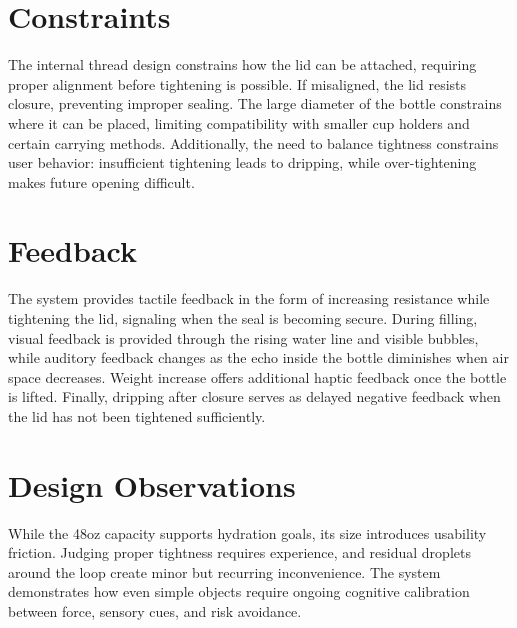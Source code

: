 \documentclass[12pt]{article}
\begin{document}
\section*{Constraints}

The internal thread design constrains how the lid can be attached, requiring proper alignment before tightening is possible. If misaligned, the lid resists closure, preventing improper sealing. The large diameter of the bottle constrains where it can be placed, limiting compatibility with smaller cup holders and certain carrying methods. Additionally, the need to balance tightness constrains user behavior: insufficient tightening leads to dripping, while over-tightening makes future opening difficult.

\section*{Feedback}

The system provides tactile feedback in the form of increasing resistance while tightening the lid, signaling when the seal is becoming secure. During filling, visual feedback is provided through the rising water line and visible bubbles, while auditory feedback changes as the echo inside the bottle diminishes when air space decreases. Weight increase offers additional haptic feedback once the bottle is lifted. Finally, dripping after closure serves as delayed negative feedback when the lid has not been tightened sufficiently.

\section*{Design Observations}

While the 48oz capacity supports hydration goals, its size introduces usability friction. Judging proper tightness requires experience, and residual droplets around the loop create minor but recurring inconvenience. The system demonstrates how even simple objects require ongoing cognitive calibration between force, sensory cues, and risk avoidance.
\end{document}
